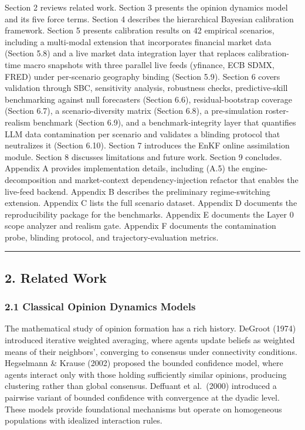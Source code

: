 \documentclass[
]{article}
\begin{document}
Section 2 reviews related work. Section 3 presents the opinion dynamics
model and its five force terms. Section 4 describes the hierarchical
Bayesian calibration framework. Section 5 presents calibration results
on 42 empirical scenarios, including a multi-modal extension that
incorporates financial market data (Section 5.8) and a live market data
integration layer that replaces calibration-time macro snapshots with
three parallel live feeds (yfinance, ECB SDMX, FRED) under per-scenario
geography binding (Section 5.9). Section 6 covers validation through
SBC, sensitivity analysis, robustness checks, predictive-skill
benchmarking against null forecasters (Section 6.6), residual-bootstrap
coverage (Section 6.7), a scenario-diversity matrix (Section 6.8), a
pre-simulation roster-realism benchmark (Section 6.9), and a
benchmark-integrity layer that quantifies LLM data contamination per
scenario and validates a blinding protocol that neutralizes it
(Section 6.10). Section 7 introduces the EnKF online assimilation
module. Section 8 discusses limitations and future work. Section 9
concludes. Appendix A provides implementation details, including (A.5)
the engine-decomposition and market-context dependency-injection
refactor that enables the live-feed backend. Appendix B describes the
preliminary regime-switching extension. Appendix C lists the full
scenario dataset. Appendix D documents the reproducibility package for
the benchmarks. Appendix E documents the Layer 0 scope analyzer and
realism gate. Appendix F documents the contamination probe, blinding
protocol, and trajectory-evaluation metrics.

\begin{center}\rule{0.5\linewidth}{0.5pt}\end{center}

\subsection{2. Related Work}\label{related-work}

\subsubsection{2.1 Classical Opinion Dynamics
Models}\label{classical-opinion-dynamics-models}

The mathematical study of opinion formation has a rich history. DeGroot
(1974) introduced iterative weighted averaging, where agents update
beliefs as weighted means of their neighbors', converging to consensus
under connectivity conditions. Hegselmann \& Krause (2002) proposed the
bounded confidence model, where agents interact only with those holding
sufficiently similar opinions, producing clustering rather than global
consensus. Deffuant et al.~(2000) introduced a pairwise variant of
bounded confidence with convergence at the dyadic level. These models
provide foundational mechanisms but operate on homogeneous populations
with idealized interaction rules.
\end{document}
